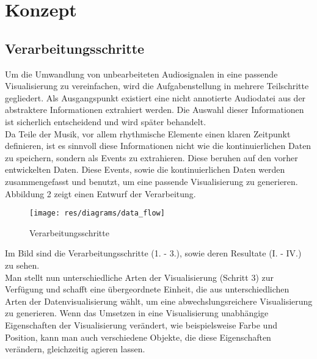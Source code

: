 \documentclass[11pt,a4paper]{article}
\begin{document}


\section{Konzept}
\subsection{Verarbeitungsschritte}
Um die Umwandlung von unbearbeiteten Audiosignalen in eine passende Visualisierung zu vereinfachen, wird die Aufgabenstellung in mehrere Teilschritte gegliedert. Als Ausgangspunkt existiert eine nicht annotierte Audiodatei aus der abstraktere Informationen extrahiert werden. Die Auswahl dieser Informationen ist sicherlich entscheidend und wird später behandelt.\\
Da Teile der Musik, vor allem rhythmische Elemente einen klaren Zeitpunkt definieren, ist es sinnvoll diese Informationen nicht wie die kontinuierlichen Daten zu speichern, sondern als Events zu extrahieren. Diese beruhen auf den vorher entwickelten Daten. Diese Events, sowie die kontinuierlichen Daten werden zusammengefasst und benutzt, um eine passende Visualisierung zu generieren. Abbildung 2 zeigt einen Entwurf der Verarbeitung.
\begin{figure}[h!]
\texttt{[image: res/diagrams/data\_flow]}
\caption[Verarbeitungsschritte]{Verarbeitungsschritte}
\end{figure}

\noindent
Im Bild sind die Verarbeitungsschritte (1. - 3.), sowie deren Resultate (I. - IV.) zu sehen.\\
Man stellt nun unterschiedliche Arten der Visualisierung (Schritt 3) zur Verfügung und schafft eine übergeordnete Einheit, die aus unterschiedlichen Arten der Datenvisualisierung wählt, um eine abwechslungsreichere Visualisierung zu generieren. Wenn das Umsetzen in eine Visualisierung unabhängige Eigenschaften der Visualisierung verändert, wie beispielsweise Farbe und Position, kann man auch verschiedene Objekte, die diese Eigenschaften verändern, gleichzeitig agieren lassen.
\end{document}
